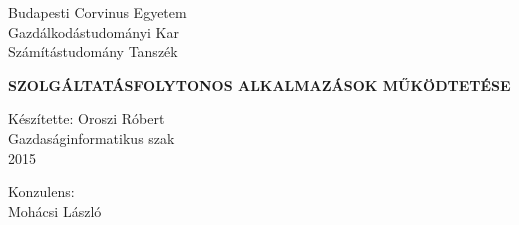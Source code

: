 \begin{raggedright}
Budapesti Corvinus Egyetem \\
Gazdálkodástudományi Kar \\
{\small Számítástudomány Tanszék}
\end{raggedright}

\thispagestyle{empty}

\vspace{3.5cm}

\vspace{0.8cm}
\begin{center}
\textbf{\Large SZOLGÁLTATÁSFOLYTONOS ALKALMAZÁSOK MŰKÖDTETÉSE}
\end{center}

\vfill
\begin{raggedleft}
Készítette: Oroszi Róbert\\
Gazdaságinformatikus szak\\
2015\\
\end{raggedleft}
\begin{raggedright}
{\Large Konzulens:}\\ Mohácsi László
\end{raggedright}
\vspace{0.6cm}


\clearpage











